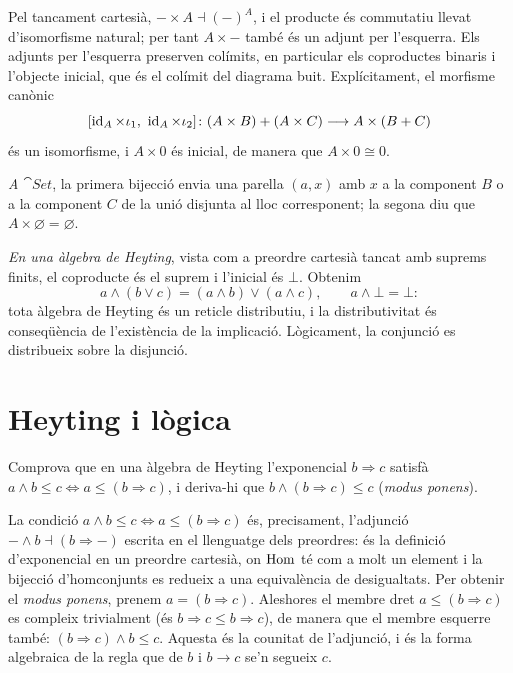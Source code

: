 \begin{solucio}
Pel tancament cartesià, $-\times A\dashv(-)^{A}$, i el producte és commutatiu llevat d'isomorfisme natural; per tant $A\times-$ també és un adjunt per l'esquerra. Els adjunts per l'esquerra preserven colímits, en particular els coproductes binaris i l'objecte inicial, que és el colímit del diagrama buit. Explícitament, el morfisme canònic
\[
[\id_A\times\iota_1,\ \id_A\times\iota_2]\colon(A\times B)+(A\times C)\longrightarrow A\times(B+C)
\]
és un isomorfisme, i $A\times 0$ és inicial, de manera que $A\times 0\cong 0$.

\emph{A $\cat{Set}$}, la primera bijecció envia una parella $(a,x)$ amb $x$ a la component $B$ o a la component $C$ de la unió disjunta al lloc corresponent; la segona diu que $A\times\varnothing=\varnothing$.

\emph{En una àlgebra de Heyting}, vista com a preordre cartesià tancat amb suprems finits, el coproducte és el suprem i l'inicial és $\bot$. Obtenim
\[
a\wedge(b\vee c)=(a\wedge b)\vee(a\wedge c),
\qquad
a\wedge\bot=\bot:
\]
tota àlgebra de Heyting és un reticle distributiu, i la distributivitat és conseqüència de l'existència de la implicació. Lògicament, la conjunció es distribueix sobre la disjunció.
\end{solucio}

\section{Heyting i lògica}

\begin{exercici}
Comprova que en una àlgebra de Heyting l'exponencial $b\Rightarrow c$ satisfà $a\wedge b\leq c\Leftrightarrow a\leq(b\Rightarrow c)$, i deriva-hi que $b\wedge(b\Rightarrow c)\leq c$ (\emph{modus ponens}).
\end{exercici}

\begin{solucio}
La condició $a\wedge b\leq c\Leftrightarrow a\leq(b\Rightarrow c)$ és, precisament, l'adjunció $-\wedge b\dashv(b\Rightarrow-)$ escrita en el llenguatge dels preordres: és la definició d'exponencial en un preordre cartesià, on $\operatorname{Hom}$ té com a molt un element i la bijecció d'homconjunts es redueix a una equivalència de desigualtats. Per obtenir el \emph{modus ponens}, prenem $a=(b\Rightarrow c)$. Aleshores el membre dret $a\leq(b\Rightarrow c)$ es compleix trivialment (és $b\Rightarrow c\leq b\Rightarrow c$), de manera que el membre esquerre també: $(b\Rightarrow c)\wedge b\leq c$. Aquesta és la counitat de l'adjunció, i és la forma algebraica de la regla que de $b$ i $b\to c$ se'n segueix $c$.
\end{solucio}

